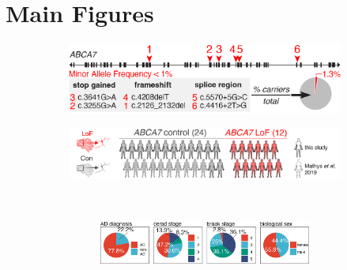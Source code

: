 \documentclass[12pt]{article}
\begin{document}
\section{Main Figures}
\label{sec:figures}
\begin{figure}[H]
    \begin{subfigure}[t]{.45\textwidth}
        \caption{}
        \includegraphics[width=\textwidth]{./main_plots/abca7_variants_cartoon.png}        
    \end{subfigure}
    \begin{subfigure}[t]{.55\textwidth}
        \caption{}
        \includegraphics[width=\textwidth]{./main_plots/cohort_cartoon.png}        
    \end{subfigure}
    \\[-1ex] 
    \begin{subfigure}[t]{.5\textwidth}
        \begin{subfigure}[t]{\textwidth}
            \caption{}
            \includegraphics[width=\textwidth]{./main_plots/pie_charts.png}        
        \end{subfigure}
        \begin{subfigure}[t]{.45\textwidth}
            \caption{}

\end{subfigure}
\end{subfigure}
\end{figure}
\end{document}

